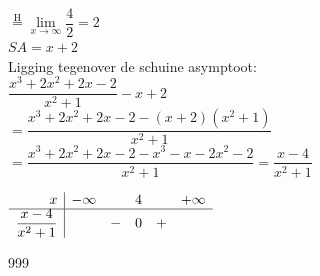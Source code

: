 \documentclass[a4paper]{article}
\begin{document}
$\overset{\mathrm{H}}{=} \lim\limits_{x\rightarrow\infty} \dfrac{4}{2} = 2$ \\

$SA = x+2$ \\

Ligging tegenover de schuine asymptoot: \\

$\dfrac{x^3+2x^2+2x-2}{x^2+1} - x+2$ \\

$= \dfrac{x^3+2x^2+2x-2-(x+2)(x^2+1)}{x^2+1}$ \\

$= \dfrac{x^3+2x^2+2x-2-x^3-x-2x^2-2}{x^2+1} = \dfrac{x-4}{x^2+1}$

$\begin{array}{r | c c c c c}
x & -\infty &  & 4 & & + \infty \\ \hline
\dfrac{x-4}{x^2+1} & & - & 0 & + \\
\end{array}$ \\


\begin{thebibliography}{999}
\end{thebibliography}
\end{document}
